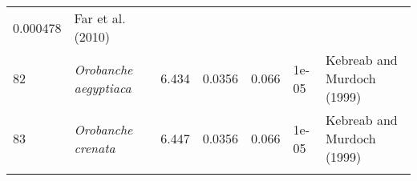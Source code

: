 \documentclass[]{article}
\begin{document}
\begin{longtable}[]{@{}lllllll@{}}
\begin{minipage}[t]{0.08\columnwidth}
0.000478\strut
\end{minipage} & \begin{minipage}[t]{0.23\columnwidth}\raggedright
Far et al. (2010)\strut
\end{minipage}\tabularnewline
\begin{minipage}[t]{0.05\columnwidth}\raggedright
82\strut
\end{minipage} & \begin{minipage}[t]{0.23\columnwidth}\raggedright
\emph{Orobanche aegyptiaca}\strut
\end{minipage} & \begin{minipage}[t]{0.05\columnwidth}\raggedright
6.434\strut
\end{minipage} & \begin{minipage}[t]{0.08\columnwidth}\raggedright
0.0356\strut
\end{minipage} & \begin{minipage}[t]{0.08\columnwidth}\raggedright
0.066\strut
\end{minipage} & \begin{minipage}[t]{0.08\columnwidth}\raggedright
1e-05\strut
\end{minipage} & \begin{minipage}[t]{0.23\columnwidth}\raggedright
Kebreab and Murdoch (1999)\strut
\end{minipage}\tabularnewline
\begin{minipage}[t]{0.05\columnwidth}\raggedright
83\strut
\end{minipage} & \begin{minipage}[t]{0.23\columnwidth}\raggedright
\emph{Orobanche crenata}\strut
\end{minipage} & \begin{minipage}[t]{0.05\columnwidth}\raggedright
6.447\strut
\end{minipage} & \begin{minipage}[t]{0.08\columnwidth}\raggedright
0.0356\strut
\end{minipage} & \begin{minipage}[t]{0.08\columnwidth}\raggedright
0.066\strut
\end{minipage} & \begin{minipage}[t]{0.08\columnwidth}\raggedright
1e-05\strut
\end{minipage} & \begin{minipage}[t]{0.23\columnwidth}\raggedright
Kebreab and Murdoch (1999)\strut
\end{minipage}\tabularnewline
\begin{minipage}[t]{0.05\columnwidth}\raggedright

\end{minipage}
\end{longtable}
\end{document}
